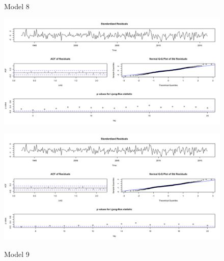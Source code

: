 \documentclass[twoside,twocolumn]{article}
\begin{document}
              \begin{figure}[H]
    	\centering
     	\caption{Model 8}
     	\includegraphics[width=\linewidth]{images/sarima8}
     	\label{fig:sarima8}
     	\caption{Model 9}
     	\includegraphics[width=\linewidth]{images/sarima9}
     	\label{fig:sarima9}
      \end{figure}
      

\end{document}
